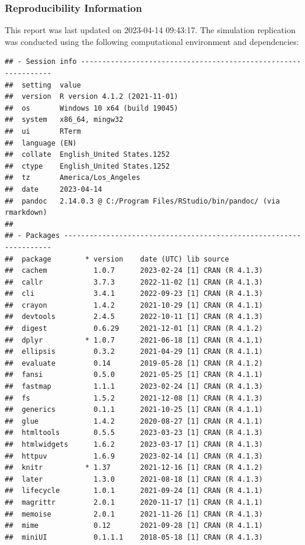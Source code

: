 \documentclass[10,a4paperpaper,]{article}
\begin{document}
\subsubsection*{Reproducibility Information}

This report was last updated on 2023-04-14 09:43:17. The simulation
replication was conducted using the following computational environment
and dependencies:

\FloatBarrier

\begin{verbatim}
## - Session info ---------------------------------------------------------------
##  setting  value
##  version  R version 4.1.2 (2021-11-01)
##  os       Windows 10 x64 (build 19045)
##  system   x86_64, mingw32
##  ui       RTerm
##  language (EN)
##  collate  English_United States.1252
##  ctype    English_United States.1252
##  tz       America/Los_Angeles
##  date     2023-04-14
##  pandoc   2.14.0.3 @ C:/Program Files/RStudio/bin/pandoc/ (via rmarkdown)
## 
## - Packages -------------------------------------------------------------------
##  package        * version    date (UTC) lib source
##  cachem           1.0.7      2023-02-24 [1] CRAN (R 4.1.3)
##  callr            3.7.3      2022-11-02 [1] CRAN (R 4.1.3)
##  cli              3.4.1      2022-09-23 [1] CRAN (R 4.1.3)
##  crayon           1.4.2      2021-10-29 [1] CRAN (R 4.1.1)
##  devtools         2.4.5      2022-10-11 [1] CRAN (R 4.1.3)
##  digest           0.6.29     2021-12-01 [1] CRAN (R 4.1.2)
##  dplyr          * 1.0.7      2021-06-18 [1] CRAN (R 4.1.1)
##  ellipsis         0.3.2      2021-04-29 [1] CRAN (R 4.1.1)
##  evaluate         0.14       2019-05-28 [1] CRAN (R 4.1.2)
##  fansi            0.5.0      2021-05-25 [1] CRAN (R 4.1.1)
##  fastmap          1.1.1      2023-02-24 [1] CRAN (R 4.1.3)
##  fs               1.5.2      2021-12-08 [1] CRAN (R 4.1.3)
##  generics         0.1.1      2021-10-25 [1] CRAN (R 4.1.1)
##  glue             1.4.2      2020-08-27 [1] CRAN (R 4.1.1)
##  htmltools        0.5.5      2023-03-23 [1] CRAN (R 4.1.3)
##  htmlwidgets      1.6.2      2023-03-17 [1] CRAN (R 4.1.3)
##  httpuv           1.6.9      2023-02-14 [1] CRAN (R 4.1.3)
##  knitr          * 1.37       2021-12-16 [1] CRAN (R 4.1.2)
##  later            1.3.0      2021-08-18 [1] CRAN (R 4.1.3)
##  lifecycle        1.0.1      2021-09-24 [1] CRAN (R 4.1.1)
##  magrittr         2.0.1      2020-11-17 [1] CRAN (R 4.1.1)
##  memoise          2.0.1      2021-11-26 [1] CRAN (R 4.1.3)
##  mime             0.12       2021-09-28 [1] CRAN (R 4.1.1)
##  miniUI           0.1.1.1    2018-05-18 [1] CRAN (R 4.1.3)

\end{verbatim}
\end{document}
